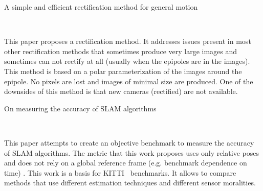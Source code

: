 \documentclass[10pt]{article}         %
\begin{document}
\begin{enumerate}
  {\Large \item A simple and efficient rectification method for
    general motion}~\cite{pollefeys1999simple}

  This paper proposes a rectification method.  It addresses issues
  present in most other rectification methods that sometimes produce
  very large images and sometimes can not rectify at all (usually when
  the epipoles are in the images).  This method is based on a polar
  parameterization of the images around the epipole.  No pixels are
  lost and images of minimal size are produced.  One of the downsides
  of this method is that new cameras (rectified) are not available.


  {\Large \item On measuring the accuracy of SLAM
    algorithms}~\cite{kummerle2009measuring}

  This paper attempts to create an objective benchmark to measure the
  accuracy of SLAM algorithms.  The metric that this work proposes
  uses only relative poses and does not rely on a global reference
  frame (e.g. benchmark dependence on time) . This work is a basis for
  KITTI~\cite{geiger2012we} benchmarks.  It allows to compare methods
  that use different estimation techniques and different sensor
  moralities.

\end{enumerate}

{} 
\end{document}
